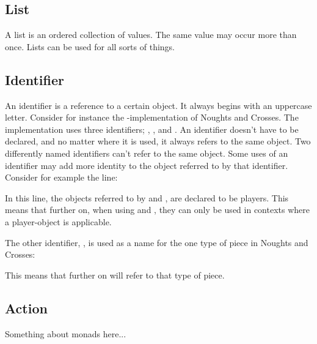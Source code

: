 \subsection{List}
A list is an ordered collection of values. The same value may occur more than once. 
Lists can be used for all sorts of things.

\subsection{Identifier}
An identifier is a reference to a certain object. It always begins with an uppercase letter.
Consider for instance the \productname-implementation
of Noughts and Crosses. The implementation uses three identifiers; ,
, and . An identifier doesn't have to be declared, and no matter
where it is used, it always refers to the same object. Two differently named identifiers can't refer
to the same object. Some uses of an identifier may add more identity to the object referred to by that
identifier. Consider for example the line:


In this line, the objects referred to by  and , are declared
to be players. This means that further on, when using  and ,
they can only be used in contexts where a player-object is applicable.

The other identifier, , is used as a name for the one type of piece in
Noughts and Crosses:


This means that further on  will refer to that type of piece.


\subsection{Action}

Something about monads here...
